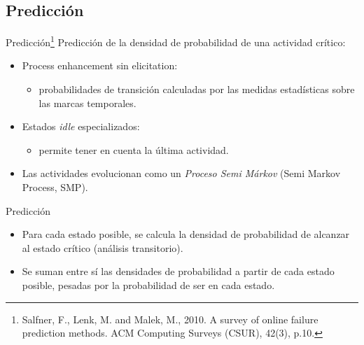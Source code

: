 \documentclass[9pt, handout]{beamer}
\begin{document}
    \subsection{Predicción}
      \begin{frame}{Predicción\footnote{Salfner, F., Lenk, M. and Malek, M., 2010. A survey of online failure prediction methods. ACM Computing Surveys (CSUR), 42(3), p.10.}}
        Predicción de la densidad de probabilidad de una actividad crítico:
        \begin{itemize}
          \item Process enhancement sin elicitation:
          \begin{itemize}
            \item probabilidades de transición calculadas por las medidas estadísticas sobre las marcas temporales.
          \end{itemize}
          \item Estados \textit{idle} especializados:
          \begin{itemize}
            \item permite tener en cuenta la última actividad.
          \end{itemize}
          \item Las actividades evolucionan como un \textit{Proceso Semi Márkov} (Semi Markov Process, SMP).
        \end{itemize}
        
      	\begin{figure}[center]
      		\scalebox{0.7}{}
      	\end{figure}
      \end{frame}
      
      \begin{frame}{Predicción}
      	
      	\begin{itemize}
        	\item Para cada estado posible, se calcula la densidad de probabilidad de alcanzar al estado crítico (análisis transitorio).
        	\item Se suman entre sí las densidades de probabilidad a partir de cada estado posible, pesadas por la probabilidad de ser en cada estado.
      	\end{itemize}
      	\vspace{-1em}
      	
      \end{frame}
      
\end{document}
